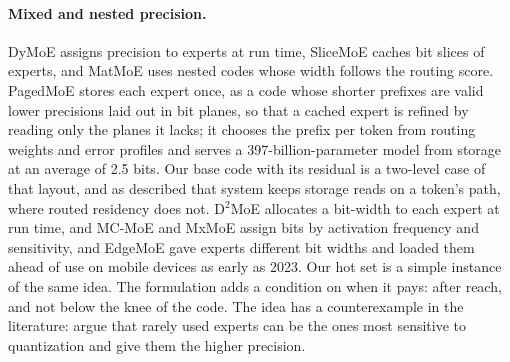 \documentclass[11pt]{article}
\begin{document}
\paragraph{Mixed and nested precision.} DyMoE \citep{huang2026dymoe} assigns precision to
experts at run time, SliceMoE \citep{choi2025slicemoe} caches bit slices of experts, and MatMoE
\citep{wei2026matmoe} uses nested codes whose width follows the routing score. PagedMoE \citep{lin2026pagedmoe} stores each expert once, as a code whose shorter prefixes are valid lower precisions laid out in bit planes, so that a cached expert is refined by reading only the planes it lacks; it chooses the prefix per token from routing weights and error profiles and serves a 397-billion-parameter model from storage at an average of 2.5 bits. Our base code with its residual is a two-level case of that layout, and as described that system keeps storage reads on a token's path, where routed residency does not. D$^2$MoE \citep{wang2025d2moe} allocates a bit-width to each expert at run time, and MC-MoE
\citep{huang2024mc} and MxMoE \citep{duanmu2025mxmoe} assign bits by activation frequency and
sensitivity, and EdgeMoE \citep{yi2023edgemoe} gave experts different bit widths and loaded them ahead of use on mobile devices as early as 2023. Our hot set is a simple instance of the same idea. The formulation adds a condition
on when it pays: after reach, and not below the knee of the code. The idea has a counterexample
in the literature: \citet{chowdhury2026efficient} argue that rarely used experts can be the ones
most sensitive to quantization and give them the higher precision.
\end{document}
